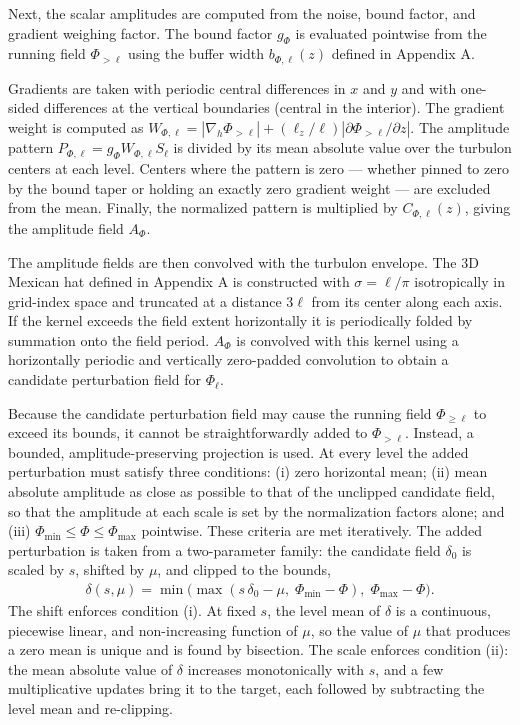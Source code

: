 \documentclass{article}
\begin{document}
Next, the scalar amplitudes are computed from the noise, bound factor, and gradient weighing factor. The bound factor $g_\Phi$ is evaluated pointwise from the running field $\Phi_{>\ell}$ using the buffer width $b_{\Phi,\ell}(z)$ defined in Appendix A.
 
Gradients are taken with periodic
central differences in $x$ and $y$ and with one-sided differences at the
vertical boundaries (central in the interior). The gradient weight is computed as $W_{\Phi,\ell} =
|\nabla_h \Phi_{>\ell}| + (\ell_z/\ell)|\partial \Phi_{>\ell}/\partial z|$. The amplitude pattern $P_{\Phi,\ell} = g_\Phi W_{\Phi,\ell} S_\ell$ is divided
by its mean absolute value over the turbulon centers at each level.
Centers where the pattern is zero --- whether pinned to zero by the bound
taper or holding an exactly zero gradient weight --- are excluded from the
mean.
Finally, the normalized pattern
is multiplied by $C_{\Phi,\ell}(z)$, giving the amplitude field
$A_\Phi$.

The amplitude fields are then convolved with the turbulon envelope. The 3D
Mexican hat defined in Appendix A is constructed
with $\sigma = \ell/\pi$ isotropically in grid-index space and truncated at a distance $3\ell$ from its center along each
axis. If the kernel exceeds
the field extent horizontally it is periodically folded by summation onto the field
period. $A_\Phi$ is convolved with this kernel using a horizontally periodic and vertically zero-padded convolution to obtain a candidate perturbation field for
$\Phi_\ell$. 

Because the candidate perturbation field may cause the running field $\Phi_{\ge\ell}$ to exceed its bounds, it cannot be straightforwardly added to $\Phi_{>\ell}$. Instead, 
a bounded,
amplitude-preserving projection is used. At every level the added perturbation
must satisfy three conditions: (i) zero horizontal mean; (ii) mean
absolute amplitude as close as possible to that of the unclipped
candidate field, so that the amplitude at each scale is set by the
normalization factors alone; and (iii) $\Phi_{\min} \le \Phi \le
\Phi_{\max}$ pointwise. These criteria are met iteratively.
The added perturbation is taken from a two-parameter family: the
candidate field $\delta_0$ is scaled by $s$, shifted by $\mu$, and
clipped to the bounds,
\begin{align}
  \delta(s,\mu) = \min\!\big(\max(s\,\delta_0 - \mu,\; \Phi_{\min} -
  \Phi),\; \Phi_{\max} - \Phi\big).
\end{align}
The shift enforces condition (i). At fixed $s$, the level mean of
$\delta$ is a continuous, piecewise linear, and non-increasing function
of $\mu$, so the value of $\mu$ that produces a zero mean is unique and
is found by bisection. The scale enforces condition (ii): the mean
absolute value of $\delta$ increases monotonically with $s$, and a few
multiplicative updates bring it to the target, each followed by
subtracting the level mean and re-clipping.
\end{document}
